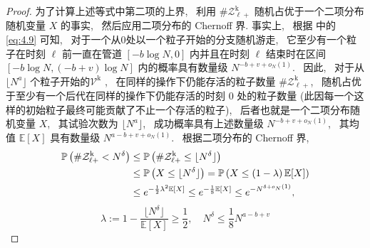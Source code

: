 \begin{proof}
{    }{
        为了计算上述等式中第二项的上界,~ 利用 $\#\mathcal Z^{\mathrm{k}}_{\ell+}$ 随机占优于一个二项分布随机变量 $X$ 的事实,~ 然后应用二项分布的 Chernoff 界. 事实上,~ 根据 中的 \eqref{eq:4.9} 可知,~ 对于一个从$0$处以一个粒子开始的分支随机游走,~ 它至少有一个粒子在时刻 $\ell$ 前一直在管道 $[-b\log N,0]$ 内并且在时刻 $\ell$ 结束时在区间 $[-b\log N, (-b+v)\log N]$ 内的概率具有数量级 $N^{-b+v+o_N(1)}$.~ 因此,~ 对于从 $\lfloor N^a\rfloor$ 个粒子开始的$\mathcal V^{\mathrm{k}}$ ,~ 在同样的操作下仍能存活的粒子数量 $\#\mathcal Z^{\mathrm{k}}_{\ell+}$,~ 随机占优于至少有一个后代在同样的操作下仍能存活的时刻 $0$ 处的粒子数量 (此因每一个这样的初始粒子最终可能贡献了不止一个存活的粒子),~ 后者也就是一个二项分布随机变量 $X$,~ 其试验次数为 $\lfloor N^a\rfloor$,~ 成功概率具有上述数量级 $N^{-b+v+o_N(1)}$,~ 其均值 $\mathbb E[X]$ 具有数量级 $N^{a-b+v+o_N(1)}$. ~根据二项分布的 Chernoff 界,
    }
    \begin{align*}
        \mathbb P\left(
            \#\mathcal Z^{\mathrm{k}}_{\ell+}
            <
            N^\delta
        \right)
        &
        \le
        \mathbb P\left(
            \#\mathcal Z^{\mathrm{k}}_{\ell+}
            \le
            \lfloor N^\delta\rfloor
        \right)
        \\ &
        \le
        \mathbb P\left(
            X
            \le
            \lfloor N^\delta\rfloor
        \right)
        =
        \mathbb P\left(
            X
            \le
            \left(
                1
                -
                \lambda
            \right)
            \mathbb E[X]
        \right)
        \\ &
        \le
        e^{
            -\frac 12
            \lambda^2
            \mathbb E[X]
        }
        \le
        e^{
            -\frac 18
            \mathbb E[X]
        }
        \le
        e^{
            -N^{
                \delta+
                o_{\text{\fontsize{5pt}{5pt}$N$}}{\text{\fontsize{6pt}{5pt}$(1)$}}
            }
        },
    \end{align*}
    \begin{equation*}
        \lambda
        :=
        1
        -
        \frac{
            \lfloor N^\delta\rfloor
        }{
            \mathbb E[X]
        }
        \ge
        \frac 12,
        \quad
        N^\delta
        \le
        \frac 18
        N^{a-b+v}
    \end{equation*}
\end{proof}
